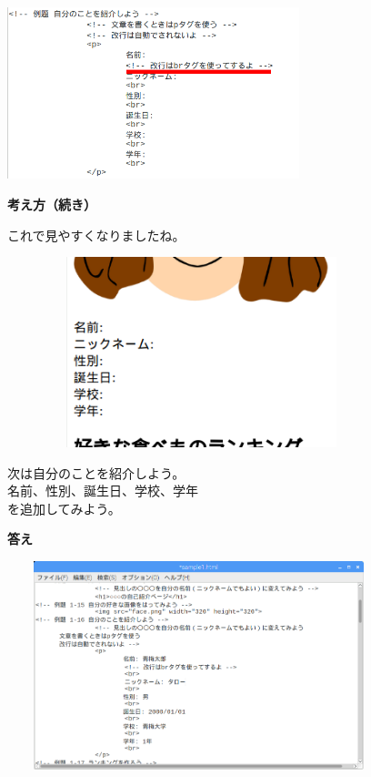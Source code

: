 \documentclass[a4paper,12pt]{jarticle}
\begin{document}
\centering
\includegraphics[width=8.504cm,height=4.983cm]{textbook-img174.png}

\clearpage
\flushleft

\textbf{考え方（続き）}


これで見やすくなりましたね。

\bigskip


\includegraphics[width=11.28cm,height=5.526cm]{textbook-img176.png}

\bigskip

次は自分のことを紹介しよう。\\
名前、性別、誕生日、学校、学年\\
を追加してみよう。



\bigskip

\bigskip


\textbf{答え}


\bigskip

\includegraphics[width=11.151cm,height=6.066cm]{textbook-img177.png}
\end{document}
